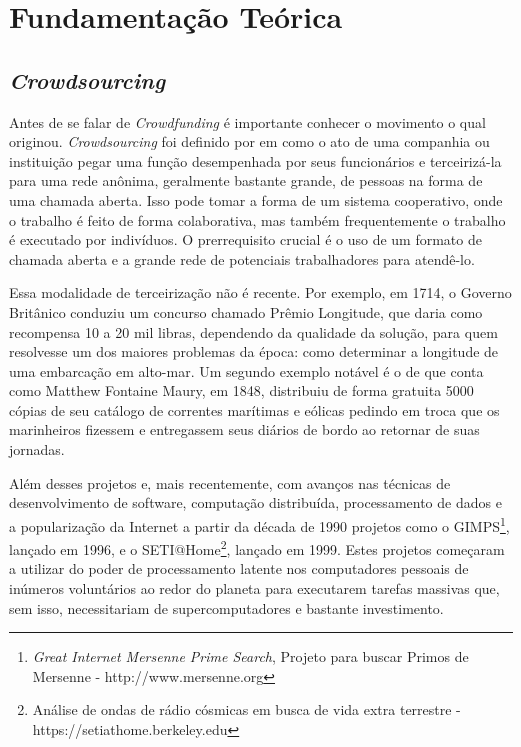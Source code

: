 \chapter{Fundamentação Teórica} \label{cha:fundamentacao}

\section{\emph{Crowdsourcing}} \label{sec:fundamentacao:crowdsourcing}
Antes de se falar de \emph{Crowdfunding} é importante conhecer o movimento o qual originou. \emph{Crowdsourcing} foi definido por \citeauthor{wired-crowdsource} em \citeyear{wired-crowdsource} como o ato de uma companhia ou instituição pegar uma função desempenhada por seus funcionários e terceirizá-la para uma rede anônima, geralmente bastante grande, de pessoas na forma de uma chamada aberta. Isso pode tomar a forma de um sistema cooperativo, onde o trabalho é feito de forma colaborativa, mas também frequentemente o trabalho é executado por indivíduos. O prerrequisito crucial é o uso de um formato de chamada aberta e a grande rede de potenciais trabalhadores para atendê-lo.

Essa modalidade de terceirização não é recente. Por exemplo, em 1714, o Governo Britânico conduziu um concurso chamado Prêmio Longitude\cite{wiki-longitude_rewards}, que daria como recompensa 10 a 20 mil libras, dependendo da qualidade da solução, para quem resolvesse um dos maiores problemas da época: como determinar a longitude de uma embarcação em alto-mar. Um segundo exemplo notável é o de \citeauthor{hearn2002tracks} que conta como Matthew Fontaine Maury, em 1848, distribuiu de forma gratuita 5000 cópias de seu catálogo de correntes marítimas e eólicas pedindo em troca que os marinheiros fizessem e entregassem seus diários de bordo ao retornar de suas jornadas.

Além desses projetos e, mais recentemente, com avanços nas técnicas de desenvolvimento de software, computação distribuída, processamento de dados e a popularização da Internet a partir da década de 1990 projetos como o GIMPS\footnote{\emph{Great Internet Mersenne Prime Search}, Projeto para buscar Primos de Mersenne - http://www.mersenne.org}, lançado em 1996, e o SETI@Home\footnote{Análise de ondas de rádio cósmicas em busca de vida extra terrestre - https://setiathome.berkeley.edu}, lançado em 1999. Estes projetos começaram a utilizar do poder de processamento latente nos computadores pessoais de inúmeros voluntários ao redor do planeta para executarem tarefas massivas que, sem isso, necessitariam de supercomputadores e bastante investimento.


